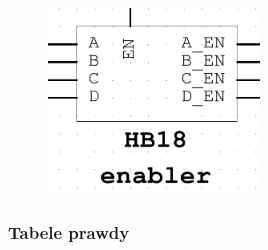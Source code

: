 \documentclass[a4paper]{article}
\begin{document}
\begin{figure}[H]
    \centering
    \includegraphics[width=0.5\textwidth]{enabler_black_box.png}
\end{figure}
\subsubsection{Tabele prawdy}
\end{document}

